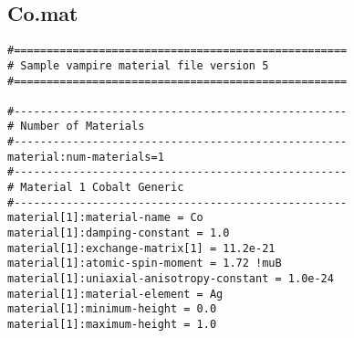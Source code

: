 \subsection*{Co.mat}
{\footnotesize
\begin{verbatim}
#===================================================
# Sample vampire material file version 5
#===================================================

#---------------------------------------------------
# Number of Materials
#---------------------------------------------------
material:num-materials=1
#---------------------------------------------------
# Material 1 Cobalt Generic
#---------------------------------------------------
material[1]:material-name = Co
material[1]:damping-constant = 1.0
material[1]:exchange-matrix[1] = 11.2e-21
material[1]:atomic-spin-moment = 1.72 !muB
material[1]:uniaxial-anisotropy-constant = 1.0e-24
material[1]:material-element = Ag
material[1]:minimum-height = 0.0
material[1]:maximum-height = 1.0
\end{verbatim}
}
